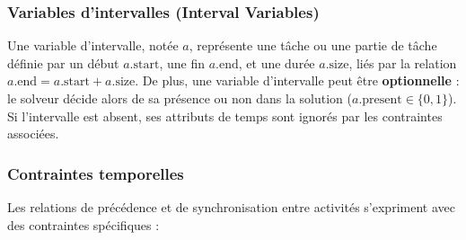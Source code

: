 \subsubsection{Variables d'intervalles (Interval Variables)}
Une variable d'intervalle, notée $a$, représente une tâche ou une partie de tâche définie par un début $a.\text{start}$, une fin $a.\text{end}$, et une durée $a.\text{size}$, liés par la relation $a.\text{end} = a.\text{start} + a.\text{size}$.
De plus, une variable d'intervalle peut être \textbf{optionnelle} : le solveur décide alors de sa présence ou non dans la solution ($a.\text{present} \in \{0, 1\}$). Si l'intervalle est absent, ses attributs de temps sont ignorés par les contraintes associées.

\subsubsection{Contraintes temporelles}
Les relations de précédence et de synchronisation entre activités s'expriment avec des contraintes spécifiques :
